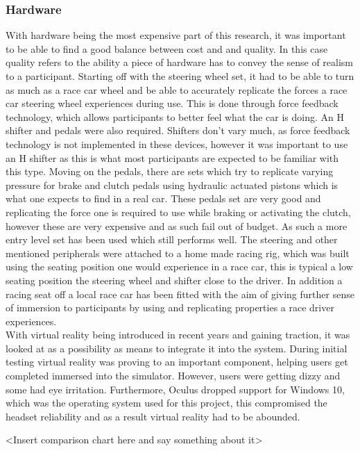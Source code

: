 \subsubsection{Hardware}
With hardware being the most expensive part of this research, it was important to be able to find a good balance between cost and and quality. In this case quality refers to the ability a piece of hardware has to convey the sense of realism to a participant. Starting off with the steering wheel set, it had to be able to turn as much as a race car wheel and be able to accurately replicate the forces a race car steering wheel experiences during use. This is done through force feedback technology, which allows participants to better feel what the car is doing. An H shifter and pedals were also required. Shifters don't vary much, as force feedback technology is not implemented in these devices, however it was important to use an H shifter as this is what most participants are expected to be familiar with this type. Moving on the pedals, there are sets which try to replicate varying pressure for brake and clutch pedals using hydraulic actuated pistons which is what one expects to find in a real car. These pedals set are very good and replicating the force one is required to use while braking or activating the clutch, however these are very expensive and as such fail out of budget. As such a more entry level set has been used which still performs well.
The steering and other mentioned peripherals were attached to a home made racing rig, which was built using the seating position one would experience in a race car, this is typical a low seating position the steering wheel and shifter close to the driver. In addition a racing seat off a local race car has been fitted with the aim of giving further sense of immersion to participants by using and replicating properties a race driver experiences.\\
With virtual reality being introduced in recent years and gaining traction, it was looked at as a possibility as means to integrate it into the system. During initial testing virtual reality was proving to an important component, helping users get completed immersed into the simulator. However, users were getting dizzy and some had eye irritation. Furthermore, Oculus dropped support for Windows 10, which was the operating system used for this project, this compromised the headset reliability and as a result virtual reality had to be abounded.

<Insert comparison chart here and say something about it>

